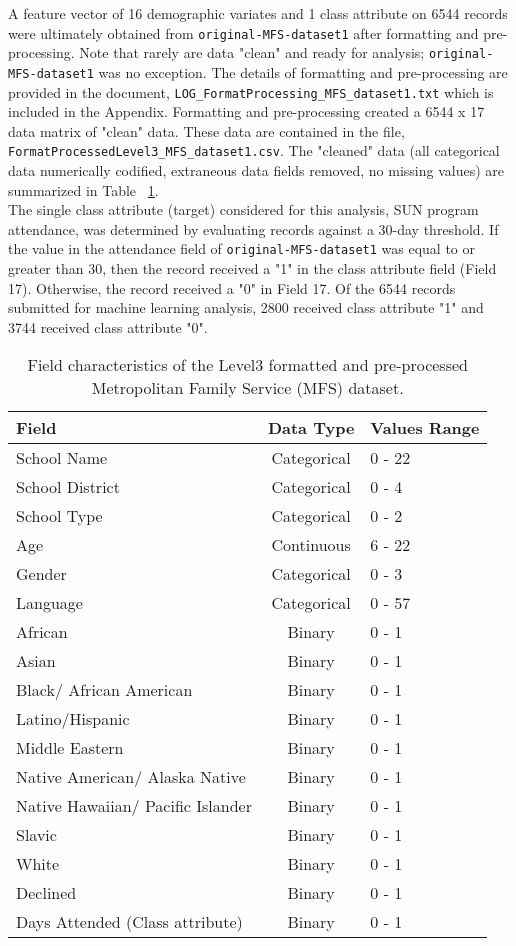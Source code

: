 \documentclass[twoside]{article}	%
\begin{document}
\noindent A feature vector of 16 demographic variates and 1 class attribute on 6544 records were ultimately obtained from \texttt{original-MFS-dataset1} after formatting and pre-processing. Note that rarely are data "clean" and ready for analysis; \texttt{original-MFS-dataset1} was no exception. The details of formatting and pre-processing are provided in the document, \verb!LOG_FormatProcessing_MFS_dataset1.txt! which is included in the Appendix. Formatting and pre-processing created a 6544 x 17 data matrix of "clean" data. These data are contained in the file, \verb!FormatProcessedLevel3_MFS_dataset1.csv!.  The "cleaned" data (all categorical data numerically codified, extraneous data fields removed, no missing values) are summarized in Table ~\ref{tab:bm1}.\\

\noindent The single class attribute (target) considered for this analysis, SUN program attendance, was determined by evaluating records against a 30-day threshold. If the value in the attendance field of \texttt{original-MFS-dataset1} was equal to or greater than 30, then the record received a "1" in the class attribute field (Field 17). Otherwise, the record received a "0" in Field 17. Of the 6544 records submitted for machine learning analysis, 2800 received class attribute "1" and 3744 received class attribute "0".

\begin{table}[!htbp] \centering 
  \caption{Field characteristics of the Level3 formatted and pre-processed Metropolitan Family Service (MFS) dataset.} 
  \label{tab:bm1} 
\begin{tabular}{@{\extracolsep{5pt}}lcl} 
\toprule
Field & \multicolumn{1}{c}{Data Type} & \multicolumn{1}{l}{Values Range} \\
\midrule
School Name & Categorical & 0 - 22 \\
School District & Categorical & 0 - 4\\
School Type & Categorical & 0 - 2\\
Age	& Continuous & 6 - 22\\
Gender & Categorical & 0 - 3\\
Language & Categorical & 0 - 57\\
African	& Binary & 0 - 1\\
Asian & Binary & 0 - 1\\
Black/ African American	& Binary & 0 - 1\\
Latino/Hispanic	& Binary & 0 - 1\\
Middle Eastern	& Binary & 0 - 1\\
Native American/ Alaska Native	& Binary & 0 - 1\\
Native Hawaiian/ Pacific Islander & Binary & 0 - 1\\
Slavic & Binary & 0 - 1\\
White & Binary & 0 - 1\\
Declined & Binary & 0 - 1\\
Days Attended (Class attribute) & Binary & 0 - 1\\
\bottomrule
\end{tabular} 
\end{table}
\end{document}
